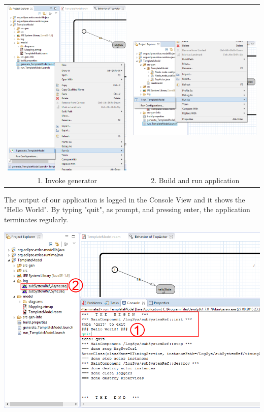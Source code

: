 \begin{tabular}{cc}
	\includegraphics[width=.45\textwidth]{images/014-generate.png} & 
	\includegraphics[width=.45\textwidth]{images/014-build_run.png} \\
	1. Invoke generator & 2. Build and run application
\end{tabular}

The output of our application is logged in the Console View and it shows the "Hello World". By typing "quit", as prompt, and pressing enter, the application terminates regularly.

\includegraphics[width=\textwidth]{images/014-quit-hello-msc.png}

